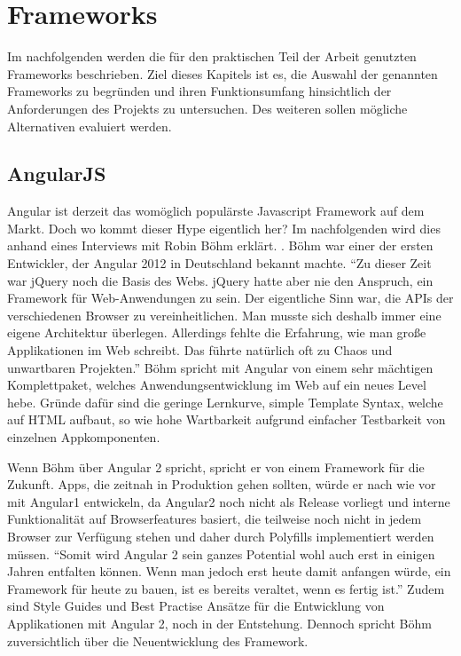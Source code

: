 
\chapter{Frameworks}
\label{chap:frameworks}

Im nachfolgenden werden die für den praktischen Teil der Arbeit genutzten Frameworks beschrieben.
Ziel dieses Kapitels ist es, die Auswahl der genannten Frameworks zu begründen und
ihren Funktionsumfang hinsichtlich der Anforderungen des Projekts zu untersuchen.
Des weiteren sollen mögliche Alternativen evaluiert werden.


\section{AngularJS}

Angular ist derzeit das womöglich populärste Javascript Framework auf dem Markt.
Doch wo kommt dieser Hype eigentlich her?
Im nachfolgenden wird dies anhand eines Interviews mit Robin Böhm erklärt. \cite{Angu68:online}.
Böhm war einer der ersten Entwickler, der Angular 2012 in Deutschland bekannt machte.
``Zu dieser Zeit war jQuery noch die Basis des Webs. jQuery hatte aber nie den Anspruch, ein Framework für Web-Anwendungen zu sein. Der eigentliche Sinn war, die APIs der verschiedenen Browser zu vereinheitlichen.
Man musste sich deshalb immer eine eigene Architektur überlegen. Allerdings fehlte die Erfahrung, wie man große Applikationen im Web schreibt. Das führte natürlich oft zu Chaos und unwartbaren Projekten.''\cite{Angu68:online}
Böhm spricht mit Angular von einem sehr mächtigen Komplettpaket, welches Anwendungsentwicklung im Web auf ein neues Level hebe.
Gründe dafür sind die geringe Lernkurve, simple Template Syntax,
welche auf HTML aufbaut, so wie hohe Wartbarkeit aufgrund einfacher Testbarkeit von einzelnen Appkomponenten.

Wenn Böhm über Angular 2 spricht, spricht er von einem Framework für die Zukunft.
Apps, die zeitnah in Produktion gehen sollten, würde er nach wie vor mit Angular1 entwickeln,
da Angular2 noch nicht als Release vorliegt und interne Funktionalität auf Browserfeatures basiert,
die teilweise noch nicht in jedem Browser zur Verfügung stehen und daher durch Polyfills implementiert werden müssen.
``Somit wird Angular 2 sein ganzes Potential wohl auch erst in einigen Jahren entfalten können.
Wenn man jedoch erst heute damit anfangen würde, ein Framework für heute zu bauen,
ist es bereits veraltet, wenn es fertig ist.''\cite{Angu68:online}
Zudem sind Style Guides und Best Practise Ansätze für die Entwicklung von Applikationen mit Angular 2,
noch in der Entstehung.
Dennoch spricht Böhm zuversichtlich über die Neuentwicklung des Framework.


